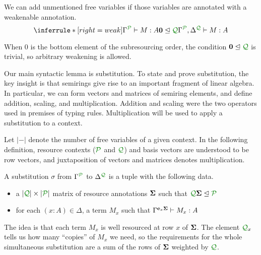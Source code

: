 \begin{lemma}[Weakening]
  We can add unmentioned free variables if those variables are annotated with a
  weakenable annotation.
  \[
    \inferrule*[right=weak]{
      \ctx{\Gamma}{P} \vdash M : A
      \\ \vct 0 \subres \resctx Q
    }
    {
      \ctx{\Gamma}{P}, \ctx{\Delta}{Q} \vdash M : A
    }
  \]
\end{lemma}

When $0$ is the bottom element of the subresourcing order, the condition $\vct 0
\subres \resctx Q$ is trivial, so arbitrary weakening is allowed.

Our main syntactic lemma is substitution.
To state and prove substitution, the key insight is that semirings give rise to
an important fragment of linear algebra.
In particular, we can form vectors and matrices of semiring elements, and define
addition, scaling, and multiplication.
Addition and scaling were the two operators used in premises of typing rules.
Multiplication will be used to apply a substitution to a context.


Let $|-|$ denote the number of free variables of a given context.
In the following definition, resource contexts ($\resctx P$ and $\resctx Q$) and
basis vectors are understood to be row vectors, and juxtaposition of vectors and
matrices denotes multiplication.

\begin{definition}
  A substitution $\sigma$ from $\Gamma^{\resctx P}$ to
  $\Delta^{\resctx Q}$ is a tuple with the following data.

  \begin{itemize}
  \item a $|\resctx Q| \times |\resctx P|$ matrix of resource annotations $\mathbf{\Sigma}$ such that $\resctx Q \mat \Sigma \subres \resctx P$
  \item for each $(x:A) \in \Delta$, a term $M_x$ such that
    $\Gamma^{\mathbf{e}_x \mathbf{\Sigma}} \vdash M_x : A$
  \end{itemize}
\end{definition}

The idea is that each term $M_x$ is well resourced at row $x$ of $\mathbf{\Sigma}$.
The element $\resctx Q_x$ tells us how many ``copies'' of $M_x$ we need, so the
requirements for the whole simultaneous substitution are a sum of the rows of
$\mathbf{\Sigma}$ weighted by $\resctx Q$.

